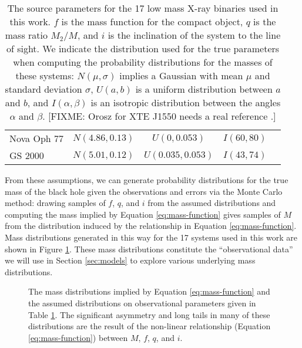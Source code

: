 \documentclass[preprint]{aastex}
\newcommand{\fixme}[1]{[FIXME: #1]}
\begin{document}
\begin{table}
\begin{center}
\begin{tabular}{|l|c|c|c|l|}
      Nova Oph 77 & $N(4.86,0.13)$ & $U(0, 0.053)$ & $I(60, 80)$ &
      \citet{Charles2006} \\
      GS 2000 & $N(5.01, 0.12)$ & $U(0.035, 0.053)$ & $I(43, 74)$ &
      \citet{Charles2006} \\
      \hline
    \end{tabular}
  \end{center}
  \caption{\label{tab:sources} The source parameters for the 17 low
    mass X-ray binaries used in this work.  $f$ is the mass function for
    the compact object, $q$ is the mass ratio $M_2/M$, and $i$ is the
    inclination of the system to the line of sight.  We indicate the
    distribution used for the true parameters when computing the
    probability distributions for the masses of these systems:
    $N(\mu,\sigma)$ implies a Gaussian with mean $\mu$ and standard
    deviation $\sigma$, $U(a,b)$ is a uniform distribution between $a$ and
    $b$, and $I(\alpha,\beta)$ is an isotropic distribution between the
    angles $\alpha$ and $\beta$.  \fixme{Orosz for XTE J1550 needs a
      real reference \citep{Orosz2010}.}} 
\end{table}

From these assumptions, we can generate probability distributions for
the true mass of the black hole given the observations and errors via
the Monte Carlo method: drawing samples of $f$, $q$, and $i$ from the
assumed distributions and computing the mass implied by Equation
\eqref{eq:mass-function} gives samples of $M$ from the distribution
induced by the relationship in Equation \eqref{eq:mass-function}.
Mass distributions generated in this way for the 17 systems used in
this work are shown in Figure \ref{fig:all-masses}.  These mass
distributions constitute the ``observational data'' we will use in
Section \ref{sec:models} to explore various underlying mass
distributions.

\begin{figure}
  \begin{center}
  \end{center}

  \caption{\label{fig:all-masses} The mass distributions implied by
    Equation \eqref{eq:mass-function} and the assumed distributions on
    observational parameters given in Table \ref{tab:sources}.  The
    significant asymmetry and long tails in many of these
    distributions are the result of the non-linear relationship
    (Equation \eqref{eq:mass-function}) between $M$, $f$, $q$, and
    $i$.}
\end{figure}
\end{document}
